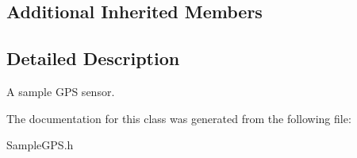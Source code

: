 \subsection*{Additional Inherited Members}


\subsection{Detailed Description}
A sample G\+PS sensor. 

The documentation for this class was generated from the following file\+:\begin{DoxyCompactItemize}
\item 
Sample\+G\+P\+S.\+h\end{DoxyCompactItemize}
